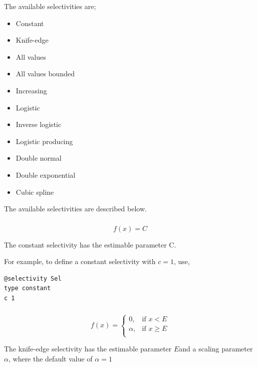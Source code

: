 The available selectivities are;
\begin{itemize}
  \item Constant
  \item Knife-edge
  \item All values
  \item All values bounded
  \item Increasing
  \item Logistic
	\item Inverse logistic
  \item Logistic producing
  \item Double normal
  \item Double exponential
	\item Cubic spline
\end{itemize}

The available selectivities are described below.

\subsubsection[Constant]{}

\begin{equation}
f(x)=C
\end{equation}

The constant selectivity has the estimable parameter C. 

For example, to define a constant selectivity with $c=1$, use,

{\small{\begin{verbatim}
@selectivity Sel
type constant
c 1
\end{verbatim}}}

\subsubsection[Knife-edge]{}

\begin{equation}
f(x)= \begin{cases}
  0, & \text{if $x < E$} \\
  \alpha, & \text{if $x \ge E$}\\ 
  \end{cases} 
\end{equation}

The knife-edge selectivity has the estimable parameter $E$and a scaling parameter $\alpha$, where the default value of $\alpha = 1$

